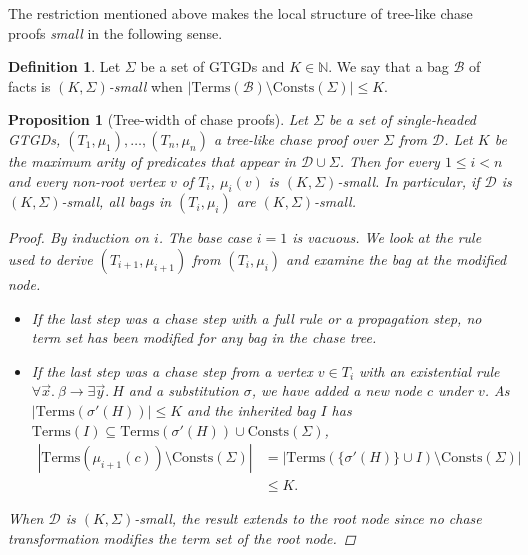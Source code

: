 \documentclass[12pt]{report}
\theoremstyle{plain}
\newtheorem{proposition}[theorem]{Proposition}
\theoremstyle{definition}
\newtheorem{definition}[theorem]{Definition}
\def\Consts{{\mathrm{Consts}}}
\def\Terms{{\mathrm{Terms}}}
\begin{document}
The restriction mentioned above makes the local structure of tree-like chase proofs \emph{small} in the following sense.

\begin{definition}
  Let $\Sigma$ be a set of GTGDs and $K \in \mathbb{N}$. We say that a bag $\mathcal{B}$ of facts is \emph{$(K, \Sigma)$-small} when $|\Terms(\mathcal{B}) \setminus \Consts(\Sigma)| \leq K$.
\end{definition}

\begin{proposition}[Tree-width of chase proofs]
\label{chase-proofs-tree-width}
  Let $\Sigma$ be a set of \emph{single-headed} GTGDs, $(T_1, \mu_1), \ldots, (T_n, \mu_n)$ a tree-like chase proof over $\Sigma$ from $\mathcal{D}$. Let $K$ be the maximum arity of predicates that appear in $\mathcal{D} \cup \Sigma$. Then for every $1 \leq i < n$ and every non-root vertex $v$ of $T_i$, $\mu_i(v)$ is $(K, \Sigma)$-small. In particular, if $\mathcal{D}$ is $(K, \Sigma)$-small, all bags in $(T_i, \mu_i)$ are $(K, \Sigma)$-small.
  \begin{proof}
    By induction on $i$. The base case $i = 1$ is vacuous. We look at the rule used to derive $(T_{i+1}, \mu_{i+1})$ from $(T_{i}, \mu_{i})$ and examine the bag at the modified node.
    \begin{itemize}
      \item If the last step was a chase step with a full rule or a propagation step, no term set has been modified for any bag in the chase tree.
      \item If the last step was a chase step from a vertex $v \in T_i$ with an existential rule $\forall \vec{x}.\ \beta \rightarrow \exists \vec{y}.\ H$ and a substitution $\sigma$, we have added a new node $c$ under $v$. As $|\Terms(\sigma'(H))| \leq K$ and the inherited bag $I$ has $\Terms(I) \subseteq \Terms(\sigma'(H)) \cup \Consts(\Sigma)$,
      \begin{equation*}
        \begin{split}
          |\Terms(\mu_{i+1}(c)) \setminus \Consts(\Sigma)|
            &= |\Terms(\{\sigma'(H)\} \cup I) \setminus \Consts(\Sigma)| \\
            &\leq K.
        \end{split}
      \end{equation*}
    \end{itemize}
    When $\mathcal{D}$ is $(K, \Sigma)$-small, the result extends to the root node since no chase transformation modifies the term set of the root node.
  \end{proof}
\end{proposition}
\end{document}
